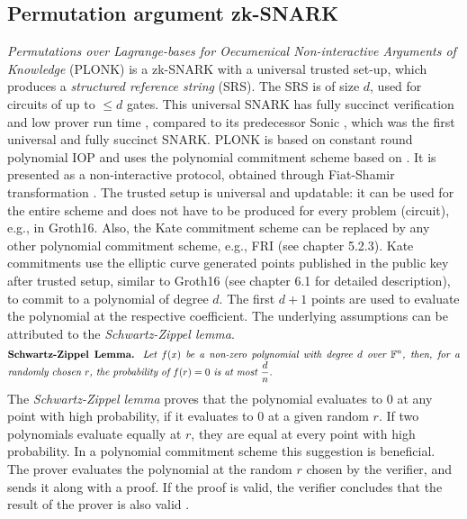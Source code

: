 \subsection{Permutation argument zk-SNARK}
\textit{Permutations over Lagrange-bases for Oecumenical Non-interactive Arguments of Knowledge} (PLONK) is a zk-SNARK with a universal trusted set-up, which produces a \textit{structured reference string} (SRS). The SRS is of size \(d\), used for circuits of up to \(\leq d\) gates. This universal SNARK has fully succinct verification and low prover run time \citep{PLONKcryptoeprint:2019/953}, compared to its predecessor Sonic \citep{SONIC10.1145/3319535.3339817}, which was the first universal and fully succinct SNARK. PLONK is based on constant round polynomial IOP and uses the polynomial commitment scheme based on \citet{Kate2010ConstantSizeCT}. It is presented as a non-interactive protocol, obtained through Fiat-Shamir transformation \citep{PLONKcryptoeprint:2019/953}. The trusted setup is universal and updatable: it can be used for the entire scheme and does not have to be produced for every problem (circuit), e.g., in Groth16. Also, the Kate commitment scheme can be replaced by any other polynomial commitment scheme, e.g., FRI (see chapter 5.2.3). 
Kate commitments use the elliptic curve generated points published in the public key after trusted setup, similar to Groth16 (see chapter 6.1 for detailed description), to commit to a polynomial of degree \(d\). The first \(d+1\) points are used to evaluate the polynomial at the respective coefficient. The underlying assumptions can be attributed to the \textit{Schwartz-Zippel lemma}.
\begin{align*}
    \text{\parbox{450pt}{\textbf{Schwartz-Zippel Lemma.} \textit{Let \(f(x)\) be a non-zero polynomial with degree \(d\) over \begin{math}\mathbb{F}^n\end{math}, then, for a randomly chosen \(r\), the probability of \(f(r) = 0\) is at most \(\frac{d}{n}\).}}}
\end{align*}
The \textit{Schwartz-Zippel lemma} proves that the polynomial evaluates to 0 at any point with high probability, if it evaluates to 0 at a given random \(r\). If two polynomials evaluate equally at \(r\), they are equal at every point with high probability. In a polynomial commitment scheme this suggestion is beneficial. The prover evaluates the polynomial at the random \(r\) chosen by the verifier, and sends it along with a proof. If the proof is valid, the verifier concludes that the result of the prover is also valid \citep{Kate2010ConstantSizeCT}.

